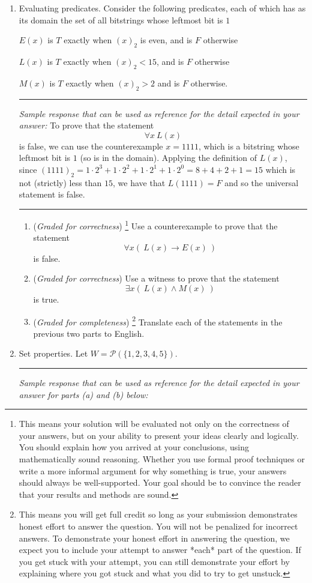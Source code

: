 \documentclass[12pt, oneside]{article}
\newcommand{\gradeCorrect}{({\it Graded for correctness}) }
\newcommand{\gradeCorrectFirst}{\gradeCorrect\footnote{This means your solution 
will be evaluated not only on the correctness of your answers, but on your ability
to present your ideas clearly and logically. You should explain how you 
arrived at your conclusions, using
mathematically sound reasoning. Whether you use formal proof techniques or 
write a more informal argument
for why something is true, your answers should always be well-supported. 
Your goal should be to convince the
reader that your results and methods are sound.} }
\newcommand{\gradeComplete}{({\it Graded for completeness}) }
\newcommand{\gradeCompleteFirst}{\gradeComplete\footnote{This means you will 
get full credit so long as your submission demonstrates honest effort to 
answer the question. You will not be penalized for incorrect answers. 
To demonstrate your honest effort in answering the question, we 
expect you to include your attempt to answer *each* part of the question. 
If you get stuck with your attempt, you can still demonstrate 
your effort by explaining where you got stuck and what 
you did to try to get unstuck.} }
\begin{document}
\begin{enumerate}[labelindent=0pt, leftmargin=0pt]
    \item  Evaluating predicates. Consider the following predicates, each of which has 
    as its domain the set of all bitstrings whose leftmost bit is $1$
    
    $E(x)$ is $T$ exactly when $(x)_{2}$ is even, and is $F$ otherwise
    
    $L(x)$ is $T$ exactly when $(x)_2 < 15$, and is $F$ otherwise
    
    $M(x)$ is $T$ exactly when $(x)_2 > 2$ and is $F$ otherwise.
    
    
    \rule{0.5\textwidth}{.4pt}
    
    {\it Sample response that can be used as reference for the detail expected 
    in your answer:} To prove that the statement $$\forall x ~L(x)$$ is false, we can use 
    the counterexample $x = 1111$, which is a bitstring whose leftmost bit is $1$ (so is in the domain).
    Applying the definition of $L(x)$, since $(1111)_2 = 1 \cdot 2^3 + 1\cdot 2^2 + 1 \cdot 2^1 + 1 \cdot 2^0 = 8 + 4+2+1 = 15$
    which is not (strictly) less than $15$, we have that $L(1111) = F$ and so the universal statement is false.
    
    
    \rule{0.5\textwidth}{.4pt}
    
    
    
    \begin{enumerate}
    \item\gradeCorrectFirst Use a counterexample to prove that the statement
    \[
    \forall x ( ~L(x) \to E(x)~)
    \]
    is false.
    
    \item\gradeCorrect Use a witness to prove that the statement
    \[
    \exists x (~L(x) \land M(x) ~)
    \]
    is true.
    
    \item\gradeCompleteFirst Translate each of the statements in the previous two
    parts to English.
    \end{enumerate}


    \item Set properties. Let $W = \mathcal{P}(\{1,2,3,4,5\})$. 


    \rule{0.5\textwidth}{.4pt}
    
    {\it Sample response that can be used as reference for the detail expected 
    in your answer for parts (a) and (b) below:} 
    

\end{enumerate}
\end{document}

